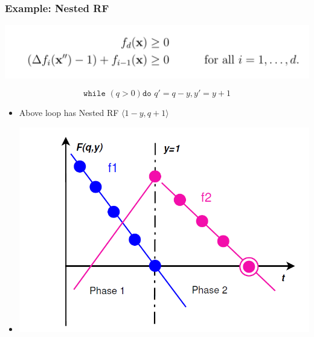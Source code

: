 \documentclass[11pt]{beamer}
\begin{document}
\begin{frame}\frametitle{Example: Nested RF}
\begin{center}
\includegraphics[scale = 0.3]{6.PNG}

\end{center}

\[\texttt{while } (q > 0) \texttt{do } q' = q - y, y ' = y + 1\]

\begin{itemize}
\item Above loop has Nested RF $\langle 1-y, q + 1\rangle$
\item 
\begin{center}
\includegraphics[scale = 0.35]{10.PNG}
\end{center}
\end{itemize}
\end{frame}
\end{document}
